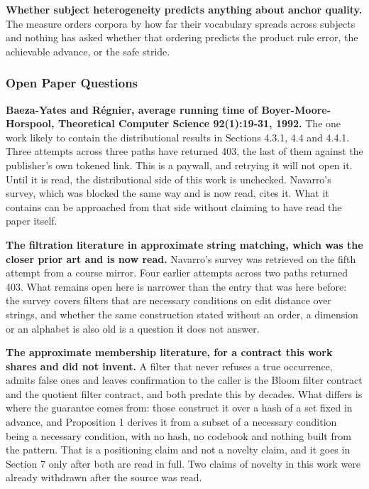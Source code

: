 \textbf{Whether subject heterogeneity predicts anything about anchor quality.} The measure orders corpora by how far their vocabulary spreads across subjects and nothing has asked whether that ordering predicts the product rule error, the achievable advance, or the safe stride.

\subsubsection{Open Paper Questions}

\textbf{Baeza-Yates and Régnier, average running time of Boyer-Moore-Horspool, Theoretical Computer Science 92(1):19-31, 1992.} The one work likely to contain the distributional results in Sections 4.3.1, 4.4 and 4.4.1. Three attempts across three paths have returned 403, the last of them against the publisher's own tokened link. This is a paywall, and retrying it will not open it. Until it is read, the distributional side of this work is unchecked. Navarro's survey, which was blocked the same way and is now read, cites it. What it contains can be approached from that side without claiming to have read the paper itself.

\textbf{The filtration literature in approximate string matching, which was the closer prior art and is now read.} Navarro's survey was retrieved on the fifth attempt from a course mirror. Four earlier attempts across two paths returned 403. What remains open here is narrower than the entry that was here before: the survey covers filters that are necessary conditions on edit distance over strings, and whether the same construction stated without an order, a dimension or an alphabet is also old is a question it does not answer.

\textbf{The approximate membership literature, for a contract this work shares and did not invent.} A filter that never refuses a true occurrence, admits false ones and leaves confirmation to the caller is the Bloom filter contract and the quotient filter contract, and both predate this by decades. What differs is where the guarantee comes from: those construct it over a hash of a set fixed in advance, and Proposition 1 derives it from a subset of a necessary condition being a necessary condition, with no hash, no codebook and nothing built from the pattern. That is a positioning claim and not a novelty claim, and it goes in Section 7 only after both are read in full. Two claims of novelty in this work were already withdrawn after the source was read.

